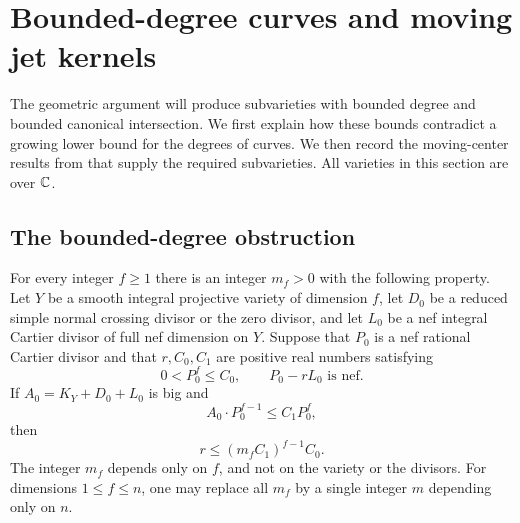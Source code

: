 \section{Bounded-degree curves and moving jet kernels}
\label{sec:jet-tools}

The geometric argument will produce subvarieties with bounded degree and
bounded canonical intersection.  We first explain how these bounds
contradict a growing lower bound for the degrees of curves.  We then
record the moving-center results from \cite{LA} that supply the required
subvarieties.  All varieties in this section are over $\mathbb C$.

\subsection{The bounded-degree obstruction}

\begin{lemma}
\label{lemma:bounded-curves}
For every integer $f\geq1$ there is an integer $m_f>0$ with the
following property.  Let $Y$ be a smooth integral projective variety
of dimension $f$, let $D_0$ be a reduced simple normal crossing divisor
or the zero divisor, and let $L_0$ be a nef integral Cartier divisor
of full nef dimension on $Y$.  Suppose that $P_0$ is a nef rational
Cartier divisor and that $r,C_0,C_1$ are positive real numbers satisfying
\[
 0<P_0^f\leq C_0,\qquad P_0-rL_0\text{ is nef}.
\]
If $A_0=K_Y+D_0+L_0$ is big and
\begin{equation}
\label{j:adjoint-ratio}
 A_0\cdot P_0^{f-1}\leq C_1P_0^f,
\end{equation}
then
\begin{equation}
\label{j:bounded-curve-obstruction}
 r\leq(m_fC_1)^{f-1}C_0.
\end{equation}
The integer $m_f$ depends only on $f$, and not on the variety or
the divisors.  For dimensions $1\leq f\leq n$, one may replace all
$m_f$ by a single integer $m$ depending only on $n$.
\end{lemma}

